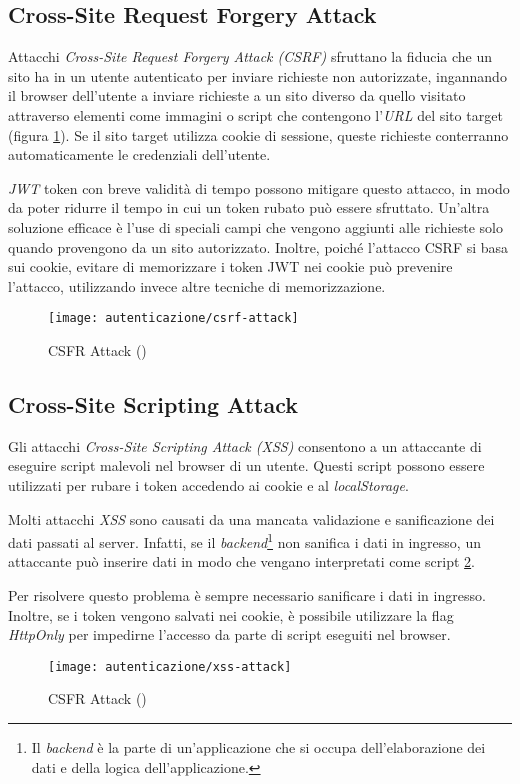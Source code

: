 \subsection{Cross-Site Request Forgery Attack}
\label{sec:csrf}
Attacchi \emph{Cross-Site Request Forgery Attack (CSRF)} sfruttano la fiducia che un sito ha in un utente autenticato per inviare richieste non autorizzate, ingannando il browser dell'utente a inviare richieste a un sito diverso da quello visitato attraverso elementi come immagini o script che contengono l'\emph{URL} del sito target (figura \ref{fig:csrf-attack}).
Se il sito target utilizza cookie di sessione, queste richieste conterranno automaticamente le credenziali dell'utente.

\emph{JWT} token con breve validità di tempo possono mitigare questo attacco, in modo da poter ridurre il tempo in cui un token rubato può essere sfruttato.
Un'altra soluzione efficace è l'use di speciali campi che vengono aggiunti alle richieste solo quando provengono da un sito autorizzato.
Inoltre, poiché l'attacco CSRF si basa sui cookie, evitare di memorizzare i token JWT nei cookie può prevenire l'attacco, utilizzando invece altre tecniche di memorizzazione.

\begin{figure}[!ht] 
    \centering 
    \texttt{[image: autenticazione/csrf-attack]} 
    \caption{CSFR Attack (\cite{site:csrf-image})}
	\label{fig:csrf-attack}
\end{figure}

\subsection{Cross-Site Scripting Attack}
\label{sec:xss}
Gli attacchi \emph{Cross-Site Scripting Attack (XSS)} consentono a un attaccante di eseguire script malevoli nel browser di un utente.
Questi script possono essere utilizzati per rubare i token accedendo ai cookie e al \emph{localStorage}.

Molti attacchi \emph{XSS} sono causati da una mancata validazione e sanificazione dei dati passati al server.
Infatti, se il \emph{backend}\footnote{Il \emph{backend} è la parte di un'applicazione che si occupa dell'elaborazione dei dati e della logica dell'applicazione.} non sanifica i dati in ingresso, un attaccante può inserire dati in modo che vengano interpretati come script \ref{fig:xss-attack}.

Per risolvere questo problema è sempre necessario sanificare i dati in ingresso.
Inoltre, se i token vengono salvati nei cookie, è possibile utilizzare la flag \emph{HttpOnly} per impedirne l'accesso da parte di script eseguiti nel browser.


\begin{figure}[!ht] 
    \centering 
    \texttt{[image: autenticazione/xss-attack]} 
    \caption{CSFR Attack (\cite{site:xss-image})}
	\label{fig:xss-attack}
\end{figure}